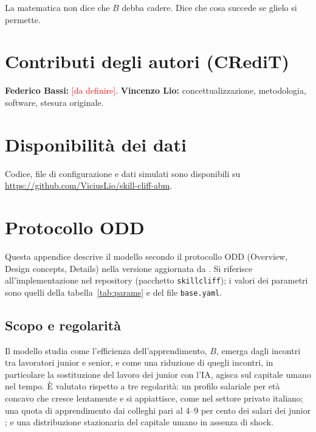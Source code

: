 \documentclass[preprint,12pt,authoryear]{elsarticle}
\newcommand{\todo}[1]{\textcolor{red}{[#1]}}
\begin{document}
La matematica non dice che $B$ debba cadere. Dice che cosa succede se glielo si permette.

\section*{Contributi degli autori (CRediT)}
\textbf{Federico Bassi:} \todo{da definire}. \textbf{Vincenzo Lio:} concettualizzazione, metodologia, software, stesura originale.

\section*{Disponibilità dei dati}
Codice, file di configurazione e dati simulati sono disponibili su \url{https://github.com/ViciusLio/skill-cliff-abm}.

\appendix
\section{Protocollo ODD}\label{app:odd}

Questa appendice descrive il modello secondo il protocollo ODD (Overview, Design concepts, Details) nella versione aggiornata da \citet{Grimm2020}. Si riferisce all'implementazione nel repository (pacchetto \texttt{skillcliff}); i valori dei parametri sono quelli della tabella~\ref{tab:params} e del file \texttt{base.yaml}.

\subsection{Scopo e regolarità}
Il modello studia come l'efficienza dell'apprendimento, $B$, emerga dagli incontri tra lavoratori junior e senior, e come una riduzione di quegli incontri, in particolare la sostituzione del lavoro dei junior con l'IA, agisca sul capitale umano nel tempo. È valutato rispetto a tre regolarità: un profilo salariale per età concavo che cresce lentamente e si appiattisce, come nel settore privato italiano; una quota di apprendimento dai colleghi pari al 4--9 per cento dei salari dei junior \citep{Jarosch2021}; e una distribuzione stazionaria del capitale umano in assenza di shock.
\end{document}
